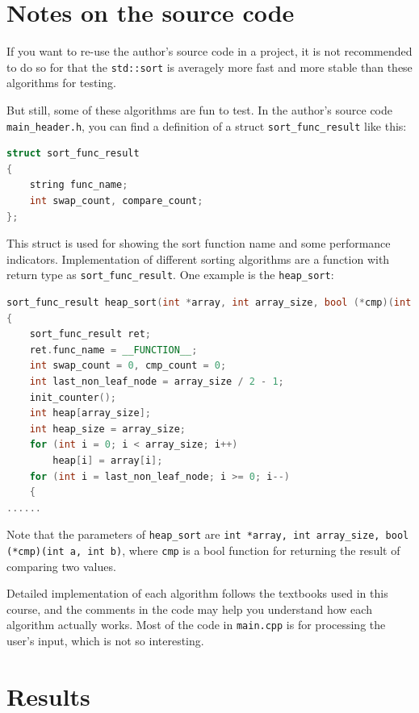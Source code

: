 \documentclass[cn,black,12pt,normal]{elegantnote}
\begin{document}
\section{Notes on the source code}

If you want to re-use the author's source code in a project, it is not recommended to do so for that the \lstinline{std::sort} is averagely more fast and more stable than these algorithms for testing. 

But still, some of these algorithms are fun to test. In the author's source code \lstinline{main_header.h}, you can find a definition of a struct \lstinline{sort_func_result} like this:
\begin{lstlisting}[language = C++]
struct sort_func_result
{
	string func_name;
	int swap_count, compare_count;
};
\end{lstlisting}
This struct is used for showing the sort function name and some performance indicators. Implementation of different sorting algorithms are a function with return type as \lstinline{sort_func_result}. One example is the \lstinline{heap_sort}:
\begin{lstlisting}[language = C++]
sort_func_result heap_sort(int *array, int array_size, bool (*cmp)(int a, int b))
{
	sort_func_result ret;
	ret.func_name = __FUNCTION__;
	int swap_count = 0, cmp_count = 0;
	int last_non_leaf_node = array_size / 2 - 1;
	init_counter();
	int heap[array_size];
	int heap_size = array_size;
	for (int i = 0; i < array_size; i++)
		heap[i] = array[i];
	for (int i = last_non_leaf_node; i >= 0; i--)
	{
......
\end{lstlisting}
Note that the parameters of \lstinline{heap_sort} are \lstinline{int *array, int array_size, bool (*cmp)(int a, int b)}, where \lstinline{cmp} is a bool function for returning the result of comparing two values.

Detailed implementation of each algorithm follows the textbooks used in this course, and the comments in the code may help you understand how each algorithm actually works. Most of the code in \lstinline{main.cpp} is for processing the user's input, which is not so interesting.


\section{Results}
\end{document}
